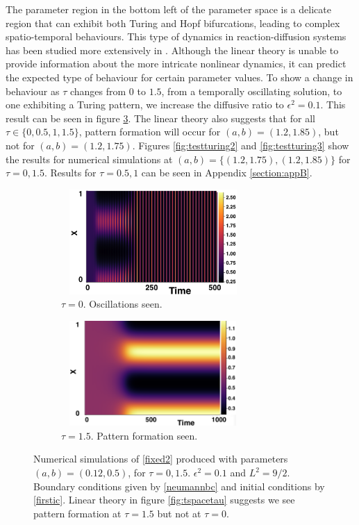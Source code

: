 The parameter region in the bottom left of the parameter space is a delicate region that can exhibit both Turing and Hopf bifurcations, leading to complex spatio-temporal behaviours. This type of dynamics in reaction-diffusion systems has been studied more extensively in \cite{krausefixed,jiang}. Although the linear theory is unable to provide information about the more intricate nonlinear dynamics, it can predict the expected type of behaviour for certain parameter values. To show a change in behaviour as $\tau$ changes from $0$ to $1.5$, from a temporally oscillating solution, to one exhibiting a Turing pattern, we increase the diffusive ratio to $\epsilon^2=0.1$. This result can be seen in figure \ref{fig:testturing}. The linear theory also suggests that for all $\tau\in\{0,0.5,1,1.5\}$, pattern formation will occur for $(a,b)=(1.2,1.85)$, but not for $(a,b)=(1.2,1.75)$. Figures \ref{fig:testturing2} and \ref{fig:testturing3} show the results for numerical simulations at $(a,b)=\{(1.2,1.75),(1.2,1.85)\}$ for $\tau=0,1.5$. Results for $\tau=0.5,1$ can be seen in Appendix \ref{section:appB}.
\begin{figure}[h]
    \centering
    \begin{subfigure}[t]{0.45\textwidth}
        \centering
        \includegraphics[width=7cm,height=4cm]{toscill.png}
        \caption{$\tau=0$. Oscillations seen.}
        \label{}
    \end{subfigure}
    \hfill
    \begin{subfigure}[t]{0.45\textwidth}
        \centering
        \includegraphics[width=7cm,height=4cm]{tpattpred.png}
        \caption{$\tau=1.5$. Pattern formation seen.}
        \label{}
    \end{subfigure}
    \caption{Numerical simulations of \eqref{fixed2} produced with parameters $(a,b)=(0.12,0.5)$, for $\tau=0,1.5$. $\epsilon^2=0.1$ and $L^2=9/2$. Boundary conditions given by \eqref{neumannbc} and initial conditions by \eqref{firstic}. Linear theory in figure \ref{fig:tspacetau} suggests we see pattern formation at $\tau=1.5$ but not at $\tau=0$.}
    \label{fig:testturing}
\end{figure}

